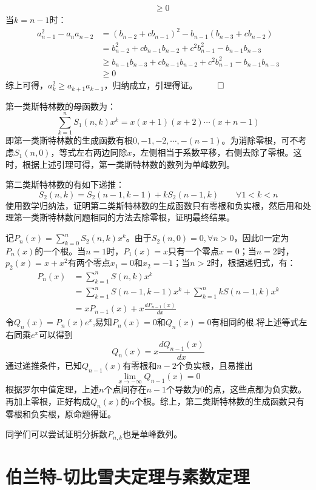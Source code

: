 ﻿\documentclass[11pt]{article}
\renewenvironment{proof}{{\noindent\hskip 2em \bf 证明 \quad}}{\hfill$\qed$\par}
\begin{document}
\begin{proof}
\begin{align*}
                &\geq 0
        \end{align*}
        当$k=n-1$时：
        \begin{align*}
            a_{n-1}^2-a_na_{n-2}&=(b_{n-2}+cb_{n-1})^2-b_{n-1}(b_{n-3}+cb_{n-2})\\
                &=b_{n-2}^2+cb_{n-1}b_{n-2}+c^2b_{n-1}^2-b_{n-1}b_{n-3}\\
                &\geq b_{n-1}b_{n-3}+cb_{n-1}b_{n-2}+c^2b_{n-1}^2-b_{n-1}b_{n-3}\\
                &\geq 0
        \end{align*}
        综上可得，$a_k^2 \geq a_{k+1}a_{k-1}$，归纳成立，引理得证。
    \end{proof}

    第一类斯特林数的母函数为：
    \[
        \sum_{k=1}^{n}S_1(n,k)x^k=x(x+1)(x+2)\cdots(x+n-1)
    \]
    即第一类斯特林数的生成函数有根$0,-1,-2,\cdots,-(n-1)$。为消除零根，可不考虑$S_1(n,0)$，等式左右两边同除$x$，左侧相当于系数平移，右侧去除了零根。这时，根据上述引理可得，第一类斯特林数的数列为单峰数列。

    第二类斯特林数的有如下递推：
    \[
        S_2(n,k)=S_2(n-1,k-1)+kS_2(n-1,k)\qquad\forall1<k<n
    \]
    使用数学归纳法，证明第二类斯特林数的生成函数只有零根和负实根，然后用和处理第一类斯特林数问题相同的方法去除零根，证明最终结果。

    记$P_n(x)=\sum_{k=0}^{n}S_2(n,k)x^k$。由于$S_2(n,0)=0,\forall n>0$，因此$0$一定为$P_n(x)$的一个根。当$n=1$时，$P_1(x)=x$只有一个零点$x=0$；当$n=2$时，$p_2(x)=x+x^2$有两个零点$x_1=0$和$x_2=-1$；当$n>2$时，根据递归式，有：
    \begin{align*}
        P_n(x)&=\sum_{k=1}^nS(n,k)x^k\\
            &=\sum_{k=1}^nS(n-1,k-1)x^k+\sum_{k=1}^nkS(n-1,k)x^k\\
            &=xP_{n-1}(x)+x\frac{dP_{n-1}(x)}{dx}
    \end{align*}
    令$Q_n(x)=P_n(x)e^x$,易知$P_n(x)=0$和$Q_n(x)=0$有相同的根.将上述等式左右同乘$e^x$可以得到
    \[
        Q_n(x)=x\frac{dQ_{n-1}(x)}{dx}
    \]
    通过递推条件，已知$Q_{n-1}(x)$有零根和$n-2$个负实根，且易推出$${\lim_{x \to -\infty}Q_{n-1}(x)=0}$$
    根据罗尔中值定理，上述$n$个点间存在$n-1$个导数为$0$的点，这些点都为负实数。再加上零根，正好构成$Q_n(x)$的$n$个根。综上，第二类斯特林数的生成函数只有零根和负实根，原命题得证。

    同学们可以尝试证明分拆数$P_{n,k}$也是单峰数列。

    \section{伯兰特-切比雪夫定理与素数定理}
\end{document}

